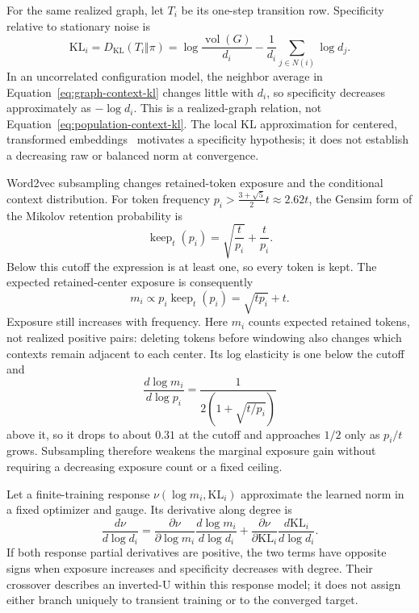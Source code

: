 \documentclass[aps,pre,reprint,superscriptaddress,longbibliography]{revtex4-2}
\DeclareMathOperator{\vol}{vol}
\begin{document}
For the same realized graph, let \(T_i\) be its one-step transition row.
Specificity relative to stationary noise is
\begin{equation}
    \mathrm{KL}_i
    =
    D_{\mathrm{KL}}(T_i\Vert\pi)
    =
    \log\frac{\vol(G)}{d_i}
    -
    \frac{1}{d_i}\sum_{j\in N(i)}\log d_j.
    \label{eq:graph-context-kl}
\end{equation}
In an uncorrelated configuration model, the neighbor average in Equation~\eqref{eq:graph-context-kl} changes little with \(d_i\), so specificity decreases approximately as \(-\log d_i\).
This is a realized-graph relation, not Equation~\eqref{eq:population-context-kl}.
The local KL approximation for centered, transformed embeddings~\citep{oyama2022norm} motivates a specificity hypothesis; it does not establish a decreasing raw or balanced norm at convergence.

Word2vec subsampling changes retained-token exposure and the conditional context distribution.
For token frequency \(p_i>\tfrac{3+\sqrt{5}}{2}t\approx2.62t\), the Gensim form of the Mikolov retention probability is~\citep{mikolov2013distributed}
\begin{equation}
    \operatorname{keep}_t(p_i)
    =
    \sqrt{\frac{t}{p_i}}+\frac{t}{p_i}.
    \label{eq:retention-probability}
\end{equation}
Below this cutoff the expression is at least one, so every token is kept.
The expected retained-center exposure is consequently
\begin{equation}
    m_i
    \propto
    p_i \operatorname{keep}_t(p_i)
    =
    \sqrt{tp_i}+t.
    \label{eq:retained-exposure}
\end{equation}
Exposure still increases with frequency.
Here \(m_i\) counts expected retained tokens, not realized positive pairs: deleting tokens before windowing also changes which contexts remain adjacent to each center.
Its log elasticity is one below the cutoff and
\begin{equation}
    \frac{d\log m_i}{d\log p_i}
    =
    \frac{1}{2\left(1+\sqrt{t/p_i}\right)}
    \label{eq:retained-elasticity}
\end{equation}
above it, so it drops to about \(0.31\) at the cutoff and approaches \(1/2\) only as \(p_i/t\) grows.
Subsampling therefore weakens the marginal exposure gain without requiring a decreasing exposure count or a fixed ceiling.

Let a finite-training response \(\nu(\log m_i,\mathrm{KL}_i)\) approximate the learned norm in a fixed optimizer and gauge.
Its derivative along degree is
\begin{equation}
    \frac{d\nu}{d\log d_i}
    =
    \frac{\partial \nu}{\partial\log m_i}
    \frac{d\log m_i}{d\log d_i}
    +
    \frac{\partial \nu}{\partial \mathrm{KL}_i}
    \frac{d\mathrm{KL}_i}{d\log d_i}.
    \label{eq:two-force-derivative}
\end{equation}
If both response partial derivatives are positive, the two terms have opposite signs when exposure increases and specificity decreases with degree.
Their crossover describes an inverted-U within this response model; it does not assign either branch uniquely to transient training or to the converged target.
\end{document}

